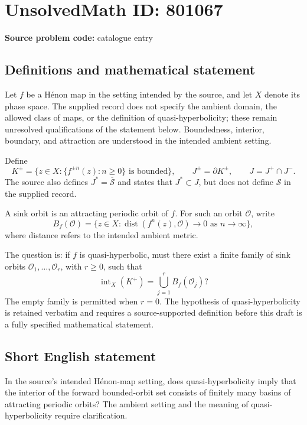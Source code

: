\documentclass[11pt]{article}
\begin{document}
\section*{UnsolvedMath ID: 801067}
\textbf{Source problem code:} catalogue entry
\subsection{Definitions and mathematical statement}
Let \(f\) be a H\'enon map in the setting intended by the source, and let \(X\) denote its phase space. The supplied record does not specify the ambient domain, the allowed class of maps, or the definition of quasi-hyperbolicity; these remain unresolved qualifications of the statement below. Boundedness, interior, boundary, and attraction are understood in the intended ambient setting.

Define
\[
K^\pm=\{z\in X:\{f^{\pm n}(z):n\geq 0\}\text{ is bounded}\},\qquad J^\pm=\partial K^\pm,\qquad J=J^+\cap J^-.
\]
The source also defines \(J^*=\overline{\mathcal S}\) and states that \(J^*\subset J\), but does not define \(\mathcal S\) in the supplied record.

A sink orbit is an attracting periodic orbit of \(f\). For such an orbit \(\mathcal O\), write
\[
B_f(\mathcal O)=\{z\in X:\operatorname{dist}(f^n(z),\mathcal O)\longrightarrow 0\text{ as }n\longrightarrow\infty\},
\]
where distance refers to the intended ambient metric.

The question is: if \(f\) is quasi-hyperbolic, must there exist a finite family of sink orbits \(\mathcal O_1,\ldots,\mathcal O_r\), with \(r\geq 0\), such that
\[
\operatorname{int}_X(K^+)=\bigcup_{j=1}^{r}B_f(\mathcal O_j)?
\]
The empty family is permitted when \(r=0\). The hypothesis of quasi-hyperbolicity is retained verbatim and requires a source-supported definition before this draft is a fully specified mathematical statement.
\subsection{Short English statement}
In the source's intended H\'enon-map setting, does quasi-hyperbolicity imply that the interior of the forward bounded-orbit set consists of finitely many basins of attracting periodic orbits? The ambient setting and the meaning of quasi-hyperbolicity require clarification.
\end{document}
